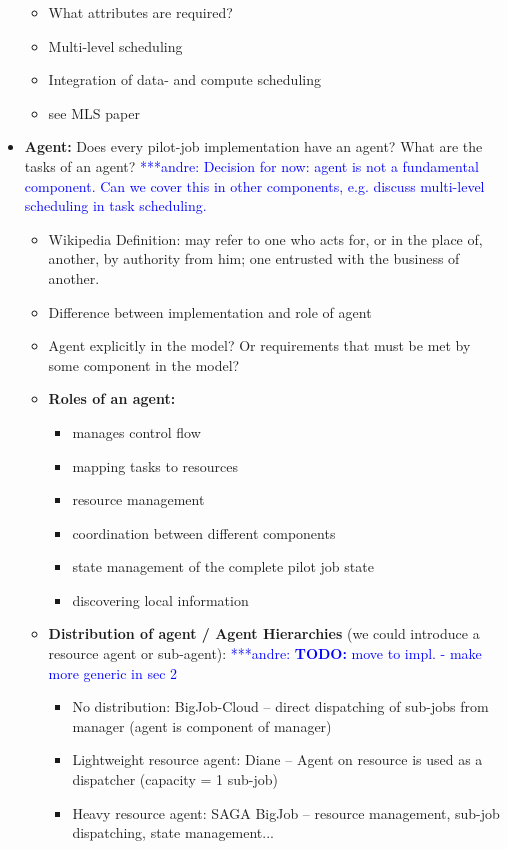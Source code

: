 \documentclass[]{article}
\newcommand{\alnote}[1]{ {\textcolor{blue} { ***andre: #1 }}}
\newcommand{\alnote}[1]{}
\begin{document}
\begin{itemize}
\begin{itemize}
	 			\item What attributes are required?
	 			\item Multi-level scheduling
	 			\item Integration of data- and compute scheduling
	 			\item see MLS paper
	\end{itemize}
	\item \textbf{Agent:} Does every pilot-job implementation have an agent? 
	What are the tasks of an agent? \alnote{Decision for now: agent is not a 
	fundamental component. Can we cover this in other components, e.g. discuss 
	multi-level scheduling in task scheduling.}
	\begin{itemize}
	    \item Wikipedia Definition: may refer to one who acts for, or in the 
	    place of, another, by authority from him; one entrusted with the 
	    business of another.
	    \item Difference between implementation and role of agent
	    \item Agent explicitly in the model? Or requirements that must be met by 
	    some component in the model?
	    \item \textbf{Roles of an agent:}
	    \begin{itemize}
	        \item manages control flow
	        \item mapping tasks to resources
	        \item resource management
	        \item coordination between different components
	        \item state management of the complete pilot job state
	        \item discovering local information
        \end{itemize}
     \item \textbf{Distribution of agent / Agent Hierarchies} (we could introduce a resource agent or sub-agent): \alnote{\textbf{TODO:} move to impl. - make more generic in sec 2}
        \begin{itemize}
    	    \item No distribution: BigJob-Cloud -- direct dispatching of sub-jobs from manager (agent is component of manager)
            \item Lightweight resource agent: Diane -- Agent on resource is used as a dispatcher (capacity = 1 sub-job)
            \item Heavy resource agent: SAGA BigJob -- resource management, sub-job dispatching, state management...
    \end{itemize}


\end{itemize}
\end{itemize}
\end{document}
